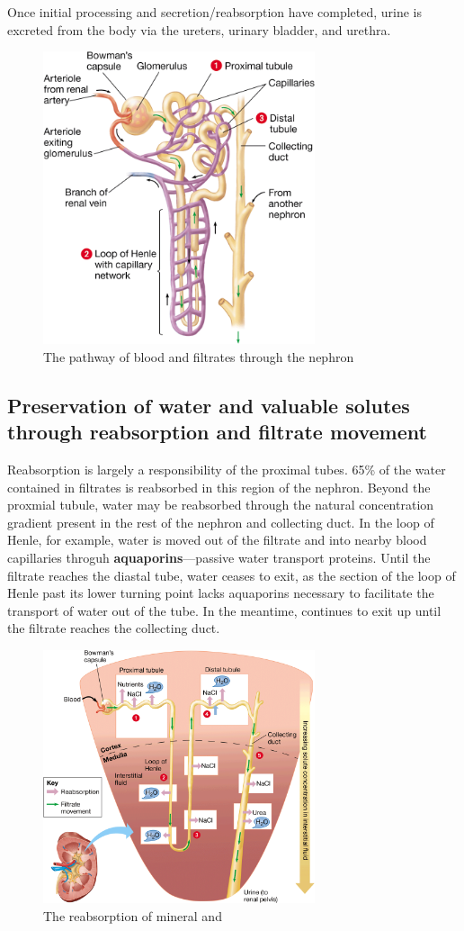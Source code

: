 \documentclass{article}
\begin{document}
Once initial processing and secretion/reabsorption have completed, urine is
excreted from the body via the ureters, urinary bladder, and urethra.

\begin{figure}
	\centering
	\includegraphics[width=8cm]{nephron_structure.png}
	\caption{The pathway of blood and filtrates through the nephron}
\end{figure}

\subsection{Preservation of water and valuable solutes through reabsorption and filtrate movement}

Reabsorption is largely a responsibility of the proximal tubes. 65\% of the
water contained in filtrates is reabsorbed in this region of the nephron.
Beyond the proxmial tubule, water may be reabsorbed through the natural
concentration gradient present in the rest of the nephron and collecting duct.
In the loop of Henle, for example, water is moved out of the filtrate and into
nearby blood capillaries throguh \textbf{aquaporins}---passive water transport
proteins. Until the filtrate reaches the diastal tube, water ceases to exit, as
the section of the loop of Henle past its lower turning point lacks aquaporins
necessary to facilitate the transport of water out of the tube. In the meantime,
 continues to exit up until the filtrate reaches the collecting duct.

\begin{figure}[H]
	\centering
	\includegraphics[width=8cm]{reabsorption_diagram.png}
	\caption{The reabsorption of mineral and }
\end{figure}
\end{document}
